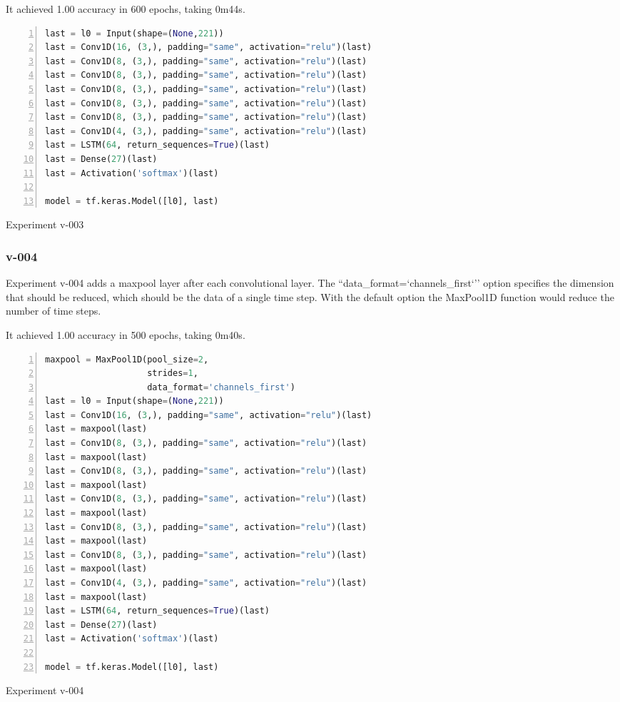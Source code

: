 It achieved 1.00 accuracy in 600 epochs, taking 0m44s.

\noindent
\begin{algorithm}
\begin{lstlisting}[language=Python, frame=single, numbers=left]
last = l0 = Input(shape=(None,221))
last = Conv1D(16, (3,), padding="same", activation="relu")(last)
last = Conv1D(8, (3,), padding="same", activation="relu")(last)
last = Conv1D(8, (3,), padding="same", activation="relu")(last)
last = Conv1D(8, (3,), padding="same", activation="relu")(last)
last = Conv1D(8, (3,), padding="same", activation="relu")(last)
last = Conv1D(8, (3,), padding="same", activation="relu")(last)
last = Conv1D(4, (3,), padding="same", activation="relu")(last)
last = LSTM(64, return_sequences=True)(last)
last = Dense(27)(last)
last = Activation('softmax')(last)

model = tf.keras.Model([l0], last)
\end{lstlisting}
\caption{\label{alg:v003}Experiment v-003}
\end{algorithm}

\subsubsection{v-004}
Experiment v-004 adds a maxpool layer after each convolutional layer. The ``data\_format=`channels\_first`'' option specifies the dimension that should be reduced, which should be the data of a single time step. With the default option the MaxPool1D function would reduce the number of time steps.

It achieved 1.00 accuracy in 500 epochs, taking 0m40s.

\noindent
\begin{algorithm}
\begin{lstlisting}[language=Python, frame=single, numbers=left]
maxpool = MaxPool1D(pool_size=2,
                    strides=1,
                    data_format='channels_first')
last = l0 = Input(shape=(None,221))
last = Conv1D(16, (3,), padding="same", activation="relu")(last)
last = maxpool(last)
last = Conv1D(8, (3,), padding="same", activation="relu")(last)
last = maxpool(last)
last = Conv1D(8, (3,), padding="same", activation="relu")(last)
last = maxpool(last)
last = Conv1D(8, (3,), padding="same", activation="relu")(last)
last = maxpool(last)
last = Conv1D(8, (3,), padding="same", activation="relu")(last)
last = maxpool(last)
last = Conv1D(8, (3,), padding="same", activation="relu")(last)
last = maxpool(last)
last = Conv1D(4, (3,), padding="same", activation="relu")(last)
last = maxpool(last)
last = LSTM(64, return_sequences=True)(last)
last = Dense(27)(last)
last = Activation('softmax')(last)

model = tf.keras.Model([l0], last)
\end{lstlisting}
\caption{\label{alg:v004}Experiment v-004}
\end{algorithm}

